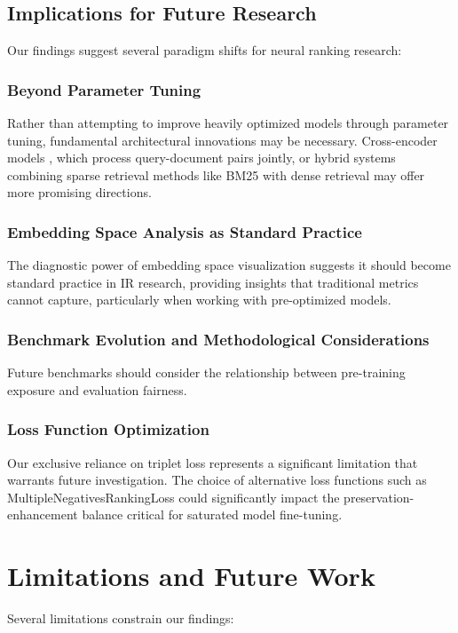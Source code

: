 \documentclass[conference]{IEEEtran}
\begin{document}
\subsection{Implications for Future Research}
Our findings suggest several paradigm shifts for neural ranking research:

\subsubsection{Beyond Parameter Tuning}
Rather than attempting to improve heavily optimized models through parameter tuning, fundamental architectural innovations may be necessary. Cross-encoder models \cite{lu2025crossencoder}, which process query-document pairs jointly, or hybrid systems combining sparse retrieval methods like BM25 \cite{robertson2009probabilistic} with dense retrieval may offer more promising directions.

\subsubsection{Embedding Space Analysis as Standard Practice}
The diagnostic power of embedding space visualization suggests it should become standard practice in IR research, providing insights that traditional metrics cannot capture, particularly when working with pre-optimized models.

\subsubsection{Benchmark Evolution and Methodological Considerations}
Future benchmarks should consider the relationship between pre-training exposure and evaluation fairness.

\subsubsection{Loss Function Optimization}
Our exclusive reliance on triplet loss represents a significant limitation that warrants future investigation. The choice of alternative loss functions such as MultipleNegativesRankingLoss \cite{sbert_losses} could significantly impact the preservation-enhancement balance critical for saturated model fine-tuning.

\section{Limitations and Future Work}
Several limitations constrain our findings:
\end{document}
